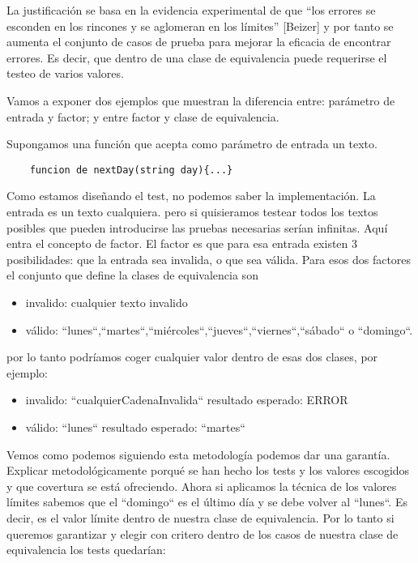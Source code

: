 La justificación se basa en la evidencia experimental de que “los errores se esconden en los rincones y se aglomeran en los límites” [Beizer] y por tanto se aumenta el conjunto de casos de prueba para mejorar la eficacia de encontrar errores. Es decir, que dentro de una clase de equivalencia puede requerirse el testeo de varios valores.

Vamos a exponer dos ejemplos que muestran la diferencia entre: parámetro de entrada y factor; y entre factor y clase de equivalencia.

Supongamos una función que acepta como parámetro de entrada un texto.

\begin{verbatim}
    funcion de nextDay(string day){...}
\end{verbatim}

Como estamos diseñando el test, no podemos saber la implementación. La entrada es un texto cualquiera. pero si quisieramos testear todos los textos posibles que pueden introducirse las pruebas necesarias serían infinitas. Aquí entra el concepto de factor. El factor es que para esa entrada existen 3 posibilidades: que la entrada sea invalida, o que sea válida. Para esos dos factores el conjunto que define la clases de equivalencia son

\begin{itemize}
    \item invalido: cualquier texto invalido
    \item válido: “lunes“,“martes“,“miércoles“,“jueves“,“viernes“,“sábado“ o “domingo“.
\end{itemize}

por lo tanto podríamos coger cualquier valor dentro de esas dos clases, por ejemplo:

\begin{itemize}
    \item invalido: “cualquierCadenaInvalida“ \rightarrow resultado esperado: ERROR
    \item válido: “lunes“  \rightarrow resultado esperado: “martes“
\end{itemize}

Vemos como podemos siguiendo esta metodología podemos dar una garantía. Explicar metodológicamente porqué se han hecho los tests y los valores escogidos y que covertura se está ofreciendo. Ahora si aplicamos la técnica de los valores límites sabemos que el “domingo“ es el último día y se debe volver al “lunes“. Es decir, es el valor límite dentro de nuestra clase de equivalencia. Por lo tanto si queremos garantizar y elegir con critero dentro de los casos de nuestra clase de equivalencia los tests quedarían:

